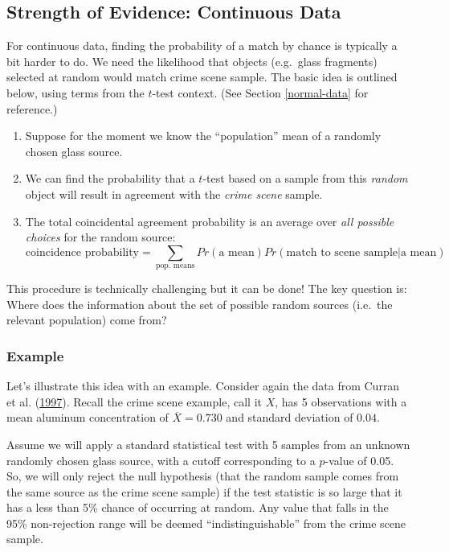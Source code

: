 \documentclass[]{book}
\providecommand{\tightlist}{%
  \setlength{\itemsep}{0pt}\setlength{\parskip}{0pt}}
\theoremstyle{definition}
\theoremstyle{definition}
\theoremstyle{remark}
\begin{document}
\subsection{Strength of Evidence: Continuous
Data}\label{strength-of-evidence-continuous-data}

For continuous data, finding the probability of a match by chance is
typically a bit harder to do. We need the likelihood that objects
(e.g.~glass fragments) selected at random would match crime scene
sample. The basic idea is outlined below, using terms from the
\(t\)-test context. (See Section \ref{normal-data} for reference.)

\begin{enumerate}
\def\labelenumi{\arabic{enumi}.}
\tightlist
\item
  Suppose for the moment we know the ``population'' mean of a randomly
  chosen glass source.
\item
  We can find the probability that a \(t\)-test based on a sample from
  this \emph{random} object will result in agreement with the
  \emph{crime scene} sample.
\item
  The total coincidental agreement probability is an average over
  \emph{all possible choices} for the random source:
  \[ \text{coincidence probability} = \sum\limits_{\text{pop. means}} Pr(\text{a mean}) Pr(\text{match to scene sample} | \text{a mean})\]
\end{enumerate}

This procedure is technically challenging but it can be done! The key
question is: Where does the information about the set of possible random
sources (i.e.~the relevant population) come from?

\subsubsection{Example}\label{example-2}

Let's illustrate this idea with an example. Consider again the data from
Curran et al. (\protect\hyperlink{ref-curranetal}{1997}). Recall the
crime scene example, call it \(X\), has 5 observations with a mean
aluminum concentration of \(\overline{X} = 0.730\) and standard
deviation of \(0.04\).

Assume we will apply a standard statistical test with 5 samples from an
unknown randomly chosen glass source, with a cutoff corresponding to a
\(p\)-value of 0.05. So, we will only reject the null hypothesis (that
the random sample comes from the same source as the crime scene sample)
if the test statistic is so large that it has a less than 5\% chance of
occurring at random. Any value that falls in the 95\% non-rejection
range will be deemed ``indistinguishable'' from the crime scene sample.
\end{document}
